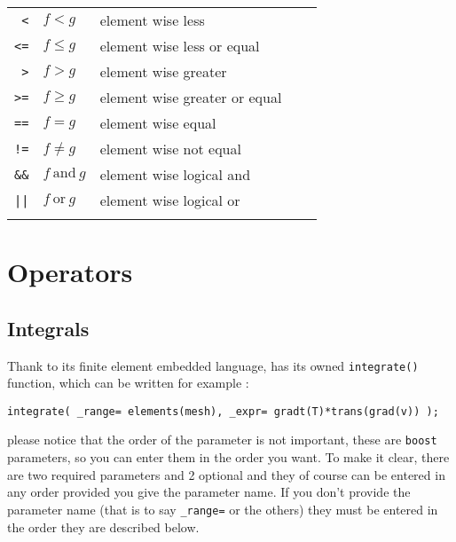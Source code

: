 \begin{longtable}[c]{rllll}
  \lstinline!<! & $f < g$ & element wise less  & & \\
  \lstinline!<=! & $f \leq g$ & element wise less or equal  & & \\
  \lstinline!>! & $f > g$ & element wise greater  & & \\
  \lstinline!>=! & $f \geq g$ & element wise greater or equal  & & \\
  \lstinline!==! & $f = g$ & element wise  equal  & & \\
  \lstinline+!=+ & $f \neq g$ & element wise not equal  & & \\
  \lstinline!&&! & $f\ \text{and}\ g$ & element wise logical and  & & \\
  \lstinline!||! & $f\ \text{or}\ g$ & element wise logical or  & & \\\hline\\

\end{longtable}


\section{Operators}

\subsection{Integrals}
\label{keywords:integrals}

Thank to its finite element embedded language, \feel has its owned \lstinline!integrate()! function, which can be written for example :
\begin{lstlisting}
integrate( _range= elements(mesh), _expr= gradt(T)*trans(grad(v)) );
\end{lstlisting}
please notice that the order of the parameter is not important, these are \lstinline!boost! parameters, so you can enter them in the order you want. 
To make it clear, there are two required parameters and 2 optional and they of course can be entered in any order
provided you give the parameter name. If you don't provide the parameter name (that is to say \lstinline!_range=! or the others) they must be entered in the order they are described
below. \\

